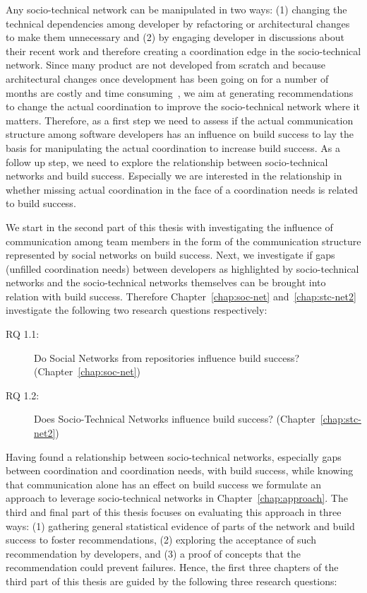 Any socio-technical network can be manipulated in two ways: (1) changing the technical dependencies among developer by refactoring or architectural changes to make them unnecessary and (2) by engaging developer in discussions about their recent work and therefore creating a coordination edge in the socio-technical network.
Since many product are not developed from scratch and because architectural changes once development has been going on for a number of months are costly and time consuming~\cite{vangurp:jss:2002}, we aim at generating recommendations to change the actual coordination to improve the socio-technical network where it matters.
Therefore, as a first step we need to assess if the actual communication structure among software developers has an influence on build success to lay the basis for manipulating the actual coordination to increase build success.
As a follow up step, we need to explore the relationship between socio-technical networks and build success.
Especially we are interested in the relationship in whether missing actual coordination in the face of a coordination needs is related to build success.

We start in the second part of this thesis with investigating the influence of communication among team members in the form of the communication structure represented by social networks on build success.
Next, we investigate if gaps (unfilled coordination needs) between developers as highlighted by socio-technical networks and the socio-technical networks themselves can be brought into relation with build success.
Therefore Chapter~\ref{chap:soc-net} and~\ref{chap:stc-net2} investigate the following two research questions respectively:

\begin{description}
  \item[RQ 1.1:] Do Social Networks from repositories influence build success? (Chapter~\ref{chap:soc-net})
  \item[RQ 1.2:] Does Socio-Technical Networks influence build success? (Chapter~\ref{chap:stc-net2})
\end{description}

Having found a relationship between socio-technical networks, especially gaps between coordination and coordination needs, with build success, while knowing that communication alone has an effect on build success we formulate an approach to leverage socio-technical networks in Chapter~\ref{chap:approach}.
The third and final part of this thesis focuses on evaluating this approach in three ways:
(1) gathering general statistical evidence of parts of the network and build success to foster recommendations,
(2) exploring the acceptance of such recommendation by developers,
and (3) a proof of concepts that the recommendation could prevent failures.
Hence, the first three chapters of the third part of this thesis are guided by the following three research questions:

